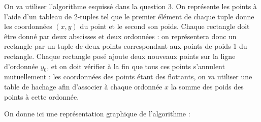 \Q
On va utiliser l'algorithme esquissé dans la question 3. On représente les points à l'aide d'un tableau de 2-tuples tel que le premier élément de chaque tuple donne les coordonnées $(x,y)$ du point et le second son poids. Chaque rectangle doit être donné par deux abscisses et deux ordonnées : on représentera donc un rectangle par un tuple de deux points correspondant aux points de poids 1 du rectangle. Chaque rectangle posé ajoute deux nouveaux points sur la ligne d'ordonnée $y_0$, et on doit vérifier à la fin que tous ces points s'annulent mutuellement : les coordonnées des points étant des flottants, on va utiliser une table de hachage afin d'associer à chaque ordonnée $x$ la somme des poids des points à cette ordonnée.
\newpage


\newpage

On donne ici une représentation graphique de l'algorithme :

